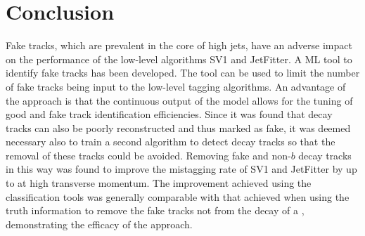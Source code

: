 


\section{Conclusion}\label{sec:fake_track_mva_conclusion}

Fake tracks, which are prevalent in the core of high \pt jets, have an adverse impact on the performance of the low-level \btagging algorithms SV1 and JetFitter.
A ML tool to identify fake tracks has been developed.
The tool can be used to limit the number of fake tracks being input to the low-level tagging algorithms.
An advantage of the approach is that the continuous output of the model allows for the tuning of good and fake track identification efficiencies.
Since it was found that \bhadron decay tracks can also be poorly reconstructed and thus marked as fake, it was deemed necessary also to train a second algorithm to detect \bhadron decay tracks so that the removal of these tracks could be avoided.
Removing fake and non-$b$ decay tracks in this way was found to improve the \ljet mistagging rate of SV1 and JetFitter by up to  at high transverse momentum.
The improvement achieved using the classification tools was generally comparable with that achieved when using the truth information to remove the fake tracks not from the decay of a \bhadron, demonstrating the efficacy of the approach.

